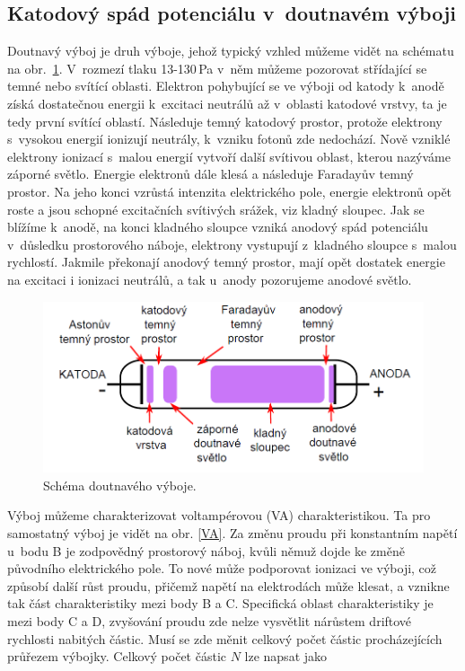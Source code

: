 \documentclass[a4paper,12pt]{article}
\begin{document}
\subsection{Katodový spád potenciálu v~doutnavém výboji}
Doutnavý výboj je druh výboje, jehož typický vzhled můžeme vidět na schématu na 
obr.~\ref{glowdischarge}. V~rozmezí tlaku 13-130\,\si{\pascal} v~něm můžeme 
pozorovat střídající se temné nebo svítící oblasti. Elektron pohybující se ve 
výboji od katody k~anodě získá dostatečnou energii k~excitaci neutrálů až 
v~oblasti katodové vrstvy, ta je tedy první svítící oblastí. Následuje temný 
katodový prostor, protože elektrony s~vysokou energií ionizují neutrály, 
k~vzniku fotonů zde nedochází. Nově vzniklé elektrony ionizací s~malou energií 
vytvoří další svítivou oblast, kterou nazýváme záporné světlo. Energie 
elektronů dále klesá a následuje Faradayův temný prostor. Na jeho konci vzrůstá 
intenzita elektrického pole, energie elektronů opět roste a jsou schopné 
excitačních svítivých srážek, viz kladný sloupec. Jak se blížíme k~anodě, na 
konci kladného sloupce vzniká anodový spád potenciálu v~důsledku prostorového 
náboje, elektrony vystupují z~kladného sloupce s~malou rychlostí. Jakmile 
překonají anodový temný prostor, mají opět dostatek energie na excitaci i 
ionizaci neutrálů, a tak u~anody pozorujeme anodové světlo.

\begin{figure}[h]
	\centering
	\includegraphics[width=130mm]{glowdischarge.png}
	\caption{Schéma doutnavého výboje.}
	\label{glowdischarge}
\end{figure}

Výboj můžeme charakterizovat voltampérovou (VA) charakteristikou. Ta pro 
samostatný výboj je vidět na obr. \ref{VA}. Za změnu proudu při konstantním 
napětí u~bodu B je zodpovědný prostorový náboj, kvůli němuž dojde ke změně 
původního elektrického pole. To nové může podporovat ionizaci ve výboji, což 
způsobí další růst proudu, přičemž napětí na elektrodách může klesat, a vznikne 
tak část charakteristiky mezi body B a C. Specifická oblast charakteristiky je 
mezi body C a D, zvyšování proudu zde nelze vysvětlit nárůstem driftové 
rychlosti nabitých částic. Musí se zde měnit celkový počet částic 
procházejících průřezem výbojky. Celkový počet částic $N$ lze napsat jako
\end{document}

